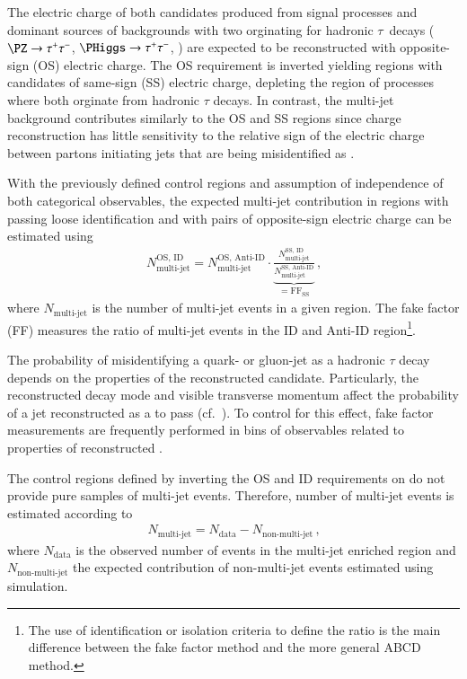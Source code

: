 The electric charge of both \tauhadvis candidates produced from signal
processes and dominant sources of backgrounds with two \tauhadvis
orginating for hadronic $\tau$~decays ($\PZ \to \tautau$,
$\PHiggs \to \tautau$, \ttbar) are expected to be reconstructed with
opposite-sign (OS) electric charge. The OS requirement is inverted
yielding regions with \tauhadvis candidates of same-sign (SS) electric
charge, depleting the region of processes where both \tauhadvis
orginate from hadronic $\tau$ decays. In contrast, the multi-jet
background contributes similarly to the OS and SS regions since
\tauhadvis charge reconstruction has little sensitivity to the
relative sign of the electric charge between partons initiating jets
that are being misidentified as \tauhadvis.

With the previously defined control regions and assumption of
independence of both categorical observables, the expected multi-jet
contribution in regions with \tauhadvis passing loose identification
and with \tauhadvis pairs of opposite-sign electric charge can be
estimated using
\begin{align*}
  N_\text{multi-jet}^{\text{OS, ID}} =
  N_\text{multi-jet}^{\text{OS, Anti-ID}}
  \cdot
  \underbrace{\frac{N_\text{multi-jet}^{\text{SS, ID}}}
  {N_\text{multi-jet}^{\text{SS, Anti-ID}}}}
  _{= \text{FF}_\text{SS}} \,\text{,}
\end{align*}
where $N_\text{multi-jet}$ is the number of multi-jet events in a
given region. The fake factor (FF) measures the ratio of multi-jet
events in the ID and Anti-ID region\footnote{The use of identification
  or isolation criteria to define the ratio is the main difference
  between the fake factor method and the more general ABCD method.}.

The probability of misidentifying a quark- or gluon-jet as a hadronic
$\tau$ decay depends on the properties of the reconstructed \tauhadvis
candidate. Particularly, the reconstructed decay mode and visible
transverse momentum affect the probability of a jet reconstructed as a
\tauhadvis to pass \tauid (cf.\ ). To control for this
effect, fake factor measurements are frequently performed in bins of
observables related to properties of reconstructed
\tauhadvis.

The control regions defined by inverting the OS and ID requirements on
\tauhadvis do not provide pure samples of multi-jet events. Therefore,
number of multi-jet events is estimated according to
\begin{align*}
  N_\text{multi-jet} = N_\text{data} - N_\text{non-multi-jet} \,\text{,}
\end{align*}
where $N_\text{data}$ is the observed number of events in the
multi-jet enriched region and $N_\text{non-multi-jet}$ the expected
contribution of non-multi-jet events estimated using simulation.

